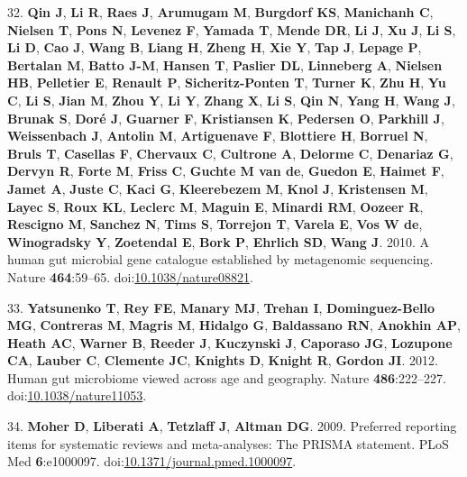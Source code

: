 \documentclass[12pt,]{article}
\begin{document}
\hypertarget{ref-Qin2010}{}
32. \textbf{Qin J}, \textbf{Li R}, \textbf{Raes J}, \textbf{Arumugam M},
\textbf{Burgdorf KS}, \textbf{Manichanh C}, \textbf{Nielsen T},
\textbf{Pons N}, \textbf{Levenez F}, \textbf{Yamada T}, \textbf{Mende
DR}, \textbf{Li J}, \textbf{Xu J}, \textbf{Li S}, \textbf{Li D},
\textbf{Cao J}, \textbf{Wang B}, \textbf{Liang H}, \textbf{Zheng H},
\textbf{Xie Y}, \textbf{Tap J}, \textbf{Lepage P}, \textbf{Bertalan M},
\textbf{Batto J-M}, \textbf{Hansen T}, \textbf{Paslier DL},
\textbf{Linneberg A}, \textbf{Nielsen HB}, \textbf{Pelletier E},
\textbf{Renault P}, \textbf{Sicheritz-Ponten T}, \textbf{Turner K},
\textbf{Zhu H}, \textbf{Yu C}, \textbf{Li S}, \textbf{Jian M},
\textbf{Zhou Y}, \textbf{Li Y}, \textbf{Zhang X}, \textbf{Li S},
\textbf{Qin N}, \textbf{Yang H}, \textbf{Wang J}, \textbf{Brunak S},
\textbf{Doré J}, \textbf{Guarner F}, \textbf{Kristiansen K},
\textbf{Pedersen O}, \textbf{Parkhill J}, \textbf{Weissenbach J},
\textbf{Antolin M}, \textbf{Artiguenave F}, \textbf{Blottiere H},
\textbf{Borruel N}, \textbf{Bruls T}, \textbf{Casellas F},
\textbf{Chervaux C}, \textbf{Cultrone A}, \textbf{Delorme C},
\textbf{Denariaz G}, \textbf{Dervyn R}, \textbf{Forte M}, \textbf{Friss
C}, \textbf{Guchte M van de}, \textbf{Guedon E}, \textbf{Haimet F},
\textbf{Jamet A}, \textbf{Juste C}, \textbf{Kaci G}, \textbf{Kleerebezem
M}, \textbf{Knol J}, \textbf{Kristensen M}, \textbf{Layec S},
\textbf{Roux KL}, \textbf{Leclerc M}, \textbf{Maguin E}, \textbf{Minardi
RM}, \textbf{Oozeer R}, \textbf{Rescigno M}, \textbf{Sanchez N},
\textbf{Tims S}, \textbf{Torrejon T}, \textbf{Varela E}, \textbf{Vos W
de}, \textbf{Winogradsky Y}, \textbf{Zoetendal E}, \textbf{Bork P},
\textbf{Ehrlich SD}, \textbf{Wang J}. 2010. A human gut microbial gene
catalogue established by metagenomic sequencing. Nature
\textbf{464}:59--65.
doi:\href{https://doi.org/10.1038/nature08821}{10.1038/nature08821}.

\hypertarget{ref-yatsunenkoux5fhumanux5f2012}{}
33. \textbf{Yatsunenko T}, \textbf{Rey FE}, \textbf{Manary MJ},
\textbf{Trehan I}, \textbf{Dominguez-Bello MG}, \textbf{Contreras M},
\textbf{Magris M}, \textbf{Hidalgo G}, \textbf{Baldassano RN},
\textbf{Anokhin AP}, \textbf{Heath AC}, \textbf{Warner B},
\textbf{Reeder J}, \textbf{Kuczynski J}, \textbf{Caporaso JG},
\textbf{Lozupone CA}, \textbf{Lauber C}, \textbf{Clemente JC},
\textbf{Knights D}, \textbf{Knight R}, \textbf{Gordon JI}. 2012. Human
gut microbiome viewed across age and geography. Nature
\textbf{486}:222--227.
doi:\href{https://doi.org/10.1038/nature11053}{10.1038/nature11053}.

\hypertarget{ref-Moher2009}{}
34. \textbf{Moher D}, \textbf{Liberati A}, \textbf{Tetzlaff J},
\textbf{Altman DG}. 2009. Preferred reporting items for systematic
reviews and meta-analyses: The PRISMA statement. PLoS Med
\textbf{6}:e1000097.
doi:\href{https://doi.org/10.1371/journal.pmed.1000097}{10.1371/journal.pmed.1000097}.
\end{document}
